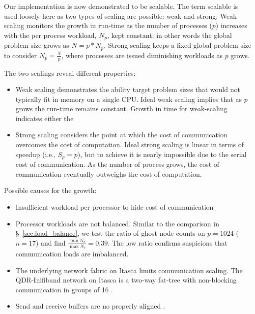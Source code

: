 \documentclass{report}
\begin{document}
Our implementation is now demonstrated to be scalable. The term scalable is used loosely here as two types of scaling are possible: weak and strong. Weak scaling monitors the growth in run-time as the number of processes ($p$) increases with the per process workload, $N_p$, kept constant; in other words the global problem size grows as $N = p*N_p$. Strong scaling keeps a fixed global problem size to consider $N_p = \frac{N}{p}$, where processes are issued diminishing workloads as $p$ grows. 

The two scalings reveal different properties:
\begin{itemize} 
\item Weak scaling demonstrates the ability target problem sizes that would not typically fit in memory on a single CPU. Ideal weak scaling implies that as $p$ grows the run-time remains constant. Growth in time for weak-scaling indicates either the 
\item Strong scaling considers the point at which the cost of communication overcomes the cost of computation. Ideal strong scaling is linear in terms of speedup (i.e., $S_p = p$), but to achieve it is nearly impossible due to the serial cost of communication. As the number of process grows, the cost of communication eventually outweighs the cost of computation. 
\end{itemize}
 



Possible causes for the growth: 
\begin{itemize} 
\item Insufficient workload per processor to hide cost of communication
\item Processor workloads are not balanced. Similar to the comparison in \S~\ref{sec:load_balance}, we test the ratio of ghost node counts on $p=1024$ ($n=17$) and find  $\frac{\min N_r}{\max N_r} = 0.39$. The low ratio confirms suspicions that communication loads are imbalanced. 
\item The underlying network fabric on Itasca limits communication scaling. The QDR-Inifiband network on Itasca is a two-way fat-tree with non-blocking communication in groups of 16 . 
\item Send and receive buffers are no properly aligned . 
\end{itemize}

\end{document}
